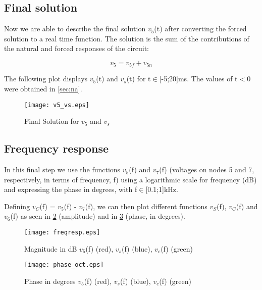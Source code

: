 \subsection{Final solution}

Now we are able to describe the final solution $v_5$(t) after converting the forced solution to a real time function. The solution is the sum of the contributions of the natural and forced responses of the circuit:  

\begin{equation}
  v_5 = v_{5f} + v_{5n}
  \label{eq:kvl20}
\end{equation}

The following plot displays $v_5$(t) and $v_s$(t) for t$\in$[-5;20]ms. The values of t$<$0 were obtained in \ref{sec:na}.

\begin{figure}[h] \centering
\texttt{[image: v5\_vs.eps]}
\caption{Final Solution for $v_5$ and $v_s$}
\label{fig:v5_vs}
\end{figure}
\FloatBarrier

\subsection{Frequency response}

In this final step we use the functions $v_5$(f) and $v_7$(f) (voltages on nodes 5 and 7, respectively, in terms of frequency, f) using a logarithmic scale for frequency (dB) and expressing the phase in degrees, with f$\in$[0.1;1]kHz. \par
Defining $v_C$(f) = $v_5$(f) - $v_7$(f), we can then plot different functions $v_S$(f), $v_C$(f) and $v_6$(f) as seen in \ref{fig:freqresp} (amplitude) and in \ref{fig:phase_oct} (phase, in degrees).


\begin{figure}[h] \centering
\texttt{[image: freqresp.eps]}
\caption{Magnitude in dB $v_5$(f) (red), $v_s$(f) (blue), $v_c$(f) (green)}
\label{fig:freqresp}
\end{figure}
\FloatBarrier

\begin{figure}[h] \centering
\texttt{[image: phase\_oct.eps]}
\caption{Phase in degrees $v_5$(f) (red), $v_s$(f) (blue), $v_c$(f) (green)}
\label{fig:phase_oct}
\end{figure}
\FloatBarrier

















